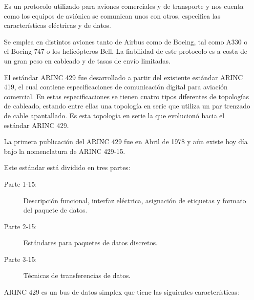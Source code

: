 Es un protocolo utilizado para aviones comerciales y de transporte
y nos cuenta como los equipos de aviónica se comunican unos con otros,
especifica las características eléctricas y de datos.

Se emplea en distintos aviones tanto de Airbus como de Boeing, tal
como A330 o el Boeing 747 o los helicópteros Bell. La fiabilidad de este
protocolo es a costa de un gran peso en cableado y de tasas de envío
limitadas.

El estándar ARINC 429 fue desarrollado a partir del existente estándar ARINC 419, el cual  contiene  especificaciones  de  comunicación  digital  para aviación   comercial.   En   estas   especificaciones   se tienen   cuatro   tipos diferentes  de  topologías  de  cableado,  estando  entre  ellas  una  topología  en serie  que  utiliza  un  par  trenzado  de  cable  apantallado.  Es  esta  topología  en serie la que evolucionó hacia el estándar ARINC 429. 

La primera publicación del ARINC 429 fue en Abril de 1978 y aún existe hoy día bajo  la  nomenclatura  de  ARINC  429-15.  

Este  estándar  está  dividido  en  tres partes:

\begin{description}
\item[Parte 1-15:] Descripción funcional, interfaz eléctrica,
  asignación de etiquetas y formato del paquete de datos.
\item[Parte 2-15:]   Estándares para paquetes de datos discretos. %
\item[Parte 3-15:] Técnicas de  transferencias de datos.
\end{description}



ARINC  429  es  un  bus  de  datos   simplex que tiene las siguientes características:

